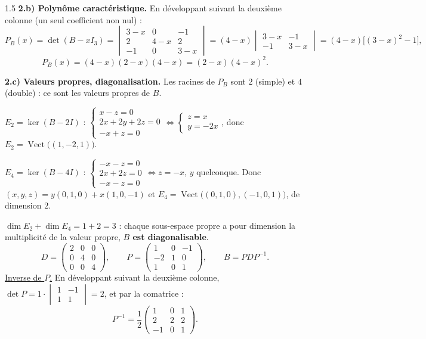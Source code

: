 \documentclass[12pt]{article}
\begin{document}
\begin{spacing}{1.5}
\textbf{2.b) Polynôme caractéristique.} En développant suivant la deuxième colonne (un seul coefficient non nul) :
\[
P_B(x)=\det(B-xI_3)=\begin{vmatrix}3-x&0&-1\\2&4-x&2\\-1&0&3-x\end{vmatrix}=(4-x)\begin{vmatrix}3-x&-1\\-1&3-x\end{vmatrix}=(4-x)\big[(3-x)^2-1\big],
\]
\[
\boxed{P_B(x)=(4-x)(2-x)(4-x)=(2-x)(4-x)^2}.
\]

\textbf{2.c) Valeurs propres, diagonalisation.} Les racines de $P_B$ sont $2$ (simple) et $4$ (double) : ce sont les valeurs propres de $B$.

\underline{$E_2=\ker(B-2I)$} : $\begin{cases}x-z=0\\2x+2y+2z=0\\-x+z=0\end{cases}\iff\begin{cases}z=x\\y=-2x\end{cases}$, donc $E_2=\operatorname{Vect}\big((1,-2,1)\big)$.

\underline{$E_4=\ker(B-4I)$} : $\begin{cases}-x-z=0\\2x+2z=0\\-x-z=0\end{cases}\iff z=-x$, $y$ quelconque. Donc $(x,y,z)=y(0,1,0)+x(1,0,-1)$ et $E_4=\operatorname{Vect}\big((0,1,0),(-1,0,1)\big)$, de dimension $2$.

$\dim E_2+\dim E_4=1+2=3$ : chaque sous-espace propre a pour dimension la multiplicité de la valeur propre, \textbf{$B$ est diagonalisable}.
\[
D=\begin{pmatrix}2&0&0\\0&4&0\\0&0&4\end{pmatrix},\qquad P=\begin{pmatrix}1&0&-1\\-2&1&0\\1&0&1\end{pmatrix},\qquad B=PDP^{-1}.
\]
\underline{Inverse de $P$.} En développant suivant la deuxième colonne, $\det P=1\cdot\begin{vmatrix}1&-1\\1&1\end{vmatrix}=2$, et par la comatrice :
\[
P^{-1}=\frac12\begin{pmatrix}1&0&1\\2&2&2\\-1&0&1\end{pmatrix}.
\]


\end{spacing}
\end{document}
